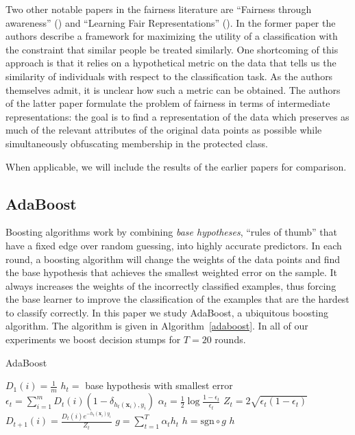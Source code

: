 \documentclass[conference]{IEEEtran}
\begin{document}
Two other notable papers in the fairness literature are ``Fairness through
awareness'' (\cite{DworkHPR12}) and ``Learning Fair Representations''
(\cite{ZemelWSPD13}).  In the former paper the authors describe a framework for
maximizing the utility of a classification with the constraint that similar
people be treated similarly. One shortcoming of this approach is that it relies
on a hypothetical metric on the data that tells us the similarity of
individuals with respect to the classification task. As the authors themselves
admit, it is unclear how such a metric can be obtained.  The authors of the
latter paper formulate the problem of fairness in terms of intermediate
representations: the goal is to find a representation of the data which
preserves as much of the relevant attributes of the original data points as
possible while simultaneously obfuscating membership in the protected class.

When applicable, we will include the results of the earlier papers for
comparison.


\subsection{AdaBoost}

Boosting algorithms work by combining \emph{base hypotheses}, ``rules of
thumb'' that have a fixed edge over random guessing, into highly
accurate predictors.  In each round, a boosting algorithm will change the
weights of the data points and find the base hypothesis that achieves the
smallest weighted error on the sample.  It always increases the weights of the
incorrectly classified examples, thus forcing the base learner to improve the
classification of the examples that are the hardest to classify correctly. In
this paper we study AdaBoost, a ubiquitous boosting algorithm.  The
algorithm is given in Algorithm~\ref{adaboost}.  In all of our experiments we
boost decision stumps for $T=20$ rounds. 

\begin{algorithm}
\caption{AdaBoost \cite{FreundS97}}
\begin{algorithmic}\label{adaboost}
\STATE $D_1(i) = \frac1m$
\ENDFOR
{}
\STATE $h_t = $ base hypothesis with smallest error
\STATE $\epsilon_t = \sum_{i=1}^m D_t(i) (1-\delta_{h_t(\mathbf x_i), y_i})$
\STATE $\alpha_t = \frac12\log\frac{1-\epsilon_t}{\epsilon_t}$
\STATE $Z_t = 2\sqrt{\epsilon_t (1-\epsilon_t)}$
\STATE $ D_{t+1}(i) = \frac{D_t(i) e^{-h_t(\mathbf x_i) y_i}}{Z_t}$
\ENDFOR
\ENDFOR
\STATE $g=\sum_{t=1}^T \alpha_t h_t$
\STATE $h = \mathrm{sgn}\circ g$
\RETURN $h$
\end{algorithmic}
\end{algorithm}
\end{document}
